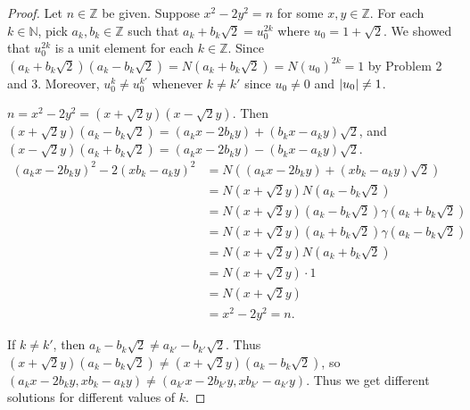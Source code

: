 \documentclass[12pt, psamsfonts]{amsart}
\theoremstyle{definition}
\theoremstyle{remark}
\numberwithin{equation}{section}
\begin{document}
\begin{proof}
  Let $n \in \mathbb{Z}$ be given.
  Suppose $x^2 - 2y^2 = n$ for some $x, y \in \mathbb{Z}$.
  For each $k \in \mathbb{N}$, pick $a_k, b_k \in \mathbb{Z}$ such that $a_k + b_k\sqrt{2} = u_0^{2k}$ where $u_0 = 1 + \sqrt{2}$.
  We showed that $u_0^{2k}$ is a unit element for each $k \in \mathbb{Z}$.
  Since $(a_k + b_k\sqrt{2})(a_k - b_k\sqrt{2}) = N(a_k + b_k\sqrt{2}) = N(u_0)^{2k} = 1$ by Problem 2 and 3.
  Moreover, $u_0^k \ne u_0^{k'}$ whenever $k \ne k'$ since $u_0 \ne 0$ and $\abs{u_0} \ne 1$.

  $n = x^2 - 2y^2 = (x + \sqrt{2}y)(x - \sqrt{2}y)$.
  Then $(x + \sqrt{2}y)(a_k - b_k\sqrt{2}) = (a_kx - 2b_ky) + (b_kx - a_ky)\sqrt{2}$, and $(x - \sqrt{2}y)(a_k + b_k\sqrt{2}) = (a_kx - 2b_ky) - (b_kx - a_ky)\sqrt{2}$.
  \begin{align*}
    (a_kx - 2b_ky)^2 - 2(xb_k - a_ky)^2
      &= N((a_kx - 2b_ky) + (xb_k - a_ky)\sqrt{2}) \\
      &= N(x + \sqrt{2}y)N(a_k - b_k\sqrt{2}) \\
      &= N(x + \sqrt{2}y)(a_k - b_k\sqrt{2})\gamma(a_k + b_k\sqrt{2}) \\
      &= N(x + \sqrt{2}y)(a_k + b_k\sqrt{2})\gamma(a_k - b_k\sqrt{2}) \\
      &= N(x + \sqrt{2}y)N(a_k + b_k\sqrt{2}) \\
      &= N(x + \sqrt{2}y) \cdot 1 \\
      &= N(x + \sqrt{2}y) \\
      &= x^2 - 2y^2 = n.
  \end{align*}

  If $k \ne k'$, then $a_k - b_k\sqrt{2} \ne a_{k'} - b_{k'}\sqrt{2}$.
  Thus $(x + \sqrt{2}y)(a_k - b_k\sqrt{2}) \ne (x + \sqrt{2}y)(a_k - b_k\sqrt{2})$, so $(a_kx - 2b_ky, xb_k - a_ky) \ne (a_{k'}x - 2b_{k'}y, xb_{k'} - a_{k'}y)$.
  Thus we get different solutions for different values of $k$.


\end{proof}
\end{document}
